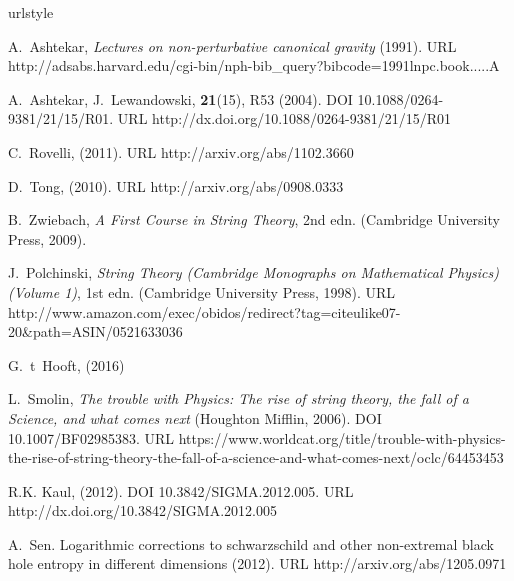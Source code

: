 \documentclass{ws-mpla}
\begin{document}
\begin{thebibliography}{0}
\providecommand{\url}[1]{{#1}}
\providecommand{\urlprefix}{URL }
\expandafter\ifx\csname urlstyle\endcsname\relax
  \providecommand{\doi}[1]{DOI \discretionary{}{}{}#1}\else
  \providecommand{\doi}{DOI \discretionary{}{}{}\begingroup
  \urlstyle{rm}\Url}\fi

A.~{Ashtekar}, \emph{Lectures on non-perturbative canonical gravity} (1991).
\newblock
  \urlprefix\url{http://adsabs.harvard.edu/cgi-bin/nph-bib\_query?bibcode=1991lnpc.book.....A}

A.~Ashtekar, J.~Lewandowski,  \textbf{21}(15), R53 (2004).
\newblock \doi{10.1088/0264-9381/21/15/R01}.
\newblock \urlprefix\url{http://dx.doi.org/10.1088/0264-9381/21/15/R01}

C.~Rovelli,   (2011).
\newblock \urlprefix\url{http://arxiv.org/abs/1102.3660}

D.~Tong,   (2010).
\newblock \urlprefix\url{http://arxiv.org/abs/0908.0333}

B.~Zwiebach, \emph{A First Course in String Theory}, 2nd edn. (Cambridge
  University Press, 2009).

J.~Polchinski, \emph{String Theory (Cambridge Monographs on Mathematical
  Physics) (Volume 1)}, 1st edn. (Cambridge University Press, 1998).
\newblock
  \urlprefix\url{http://www.amazon.com/exec/obidos/redirect?tag=citeulike07-20\&path=ASIN/0521633036}

G.~t~Hooft,   (2016)

L.~Smolin, \emph{{The trouble with Physics: The rise of string theory, the fall
  of a Science, and what comes next}} (Houghton Mifflin, 2006).
\newblock \doi{10.1007/BF02985383}.
\newblock
  \urlprefix\url{https://www.worldcat.org/title/trouble-with-physics-the-rise-of-string-theory-the-fall-of-a-science-and-what-comes-next/oclc/64453453}

R.K. Kaul,   (2012).
\newblock \doi{10.3842/SIGMA.2012.005}.
\newblock \urlprefix\url{http://dx.doi.org/10.3842/SIGMA.2012.005}

A.~Sen.
\newblock Logarithmic corrections to schwarzschild and other non-extremal black
  hole entropy in different dimensions (2012).
\newblock \urlprefix\url{http://arxiv.org/abs/1205.0971}


\end{thebibliography}
\end{document}
